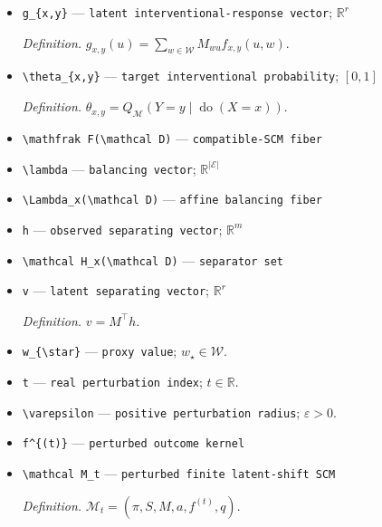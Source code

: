 \documentclass{article}
\begin{document}
\begin{itemize}
  \item \texttt{g\_\allowbreak{}\{x,\allowbreak{}y\}\allowbreak{}} --- \texttt{latent interventional-\allowbreak{}response vector}; \(\mathbb R^r\)
  \par\smallskip\noindent\emph{Definition.} \(g_{x,y}(u)=\sum_{w\in\mathcal W}M_{wu}f_{x,y}(u,w)\).
  \item \texttt{\textbackslash{}\allowbreak{}theta\_\allowbreak{}\{x,\allowbreak{}y\}\allowbreak{}} --- \texttt{target interventional probability}; \([0,1]\)
  \par\smallskip\noindent\emph{Definition.} \(\theta_{x,y}=Q_{\mathcal M}(Y=y\mid\operatorname{do}(X=x))\).
  \item \texttt{\textbackslash{}\allowbreak{}mathfrak F(\textbackslash{}\allowbreak{}mathcal D)} --- \texttt{compatible-\allowbreak{}SCM fiber}
  \item \texttt{\textbackslash{}\allowbreak{}lambda} --- \texttt{balancing vector}; \(\mathbb R^{\lvert\mathcal E\rvert}\)
  \item \texttt{\textbackslash{}\allowbreak{}Lambda\_\allowbreak{}x(\textbackslash{}\allowbreak{}mathcal D)} --- \texttt{affine balancing fiber}
  \item \texttt{h} --- \texttt{observed separating vector}; \(\mathbb R^m\)
  \item \texttt{\textbackslash{}\allowbreak{}mathcal H\_\allowbreak{}x(\textbackslash{}\allowbreak{}mathcal D)} --- \texttt{separator set}
  \item \texttt{v} --- \texttt{latent separating vector}; \(\mathbb R^r\)
  \par\smallskip\noindent\emph{Definition.} \(v=M^{\top}h\).
  \item \texttt{w\_\allowbreak{}\{\textbackslash{}\allowbreak{}star\}\allowbreak{}} --- \texttt{proxy value}; \(w_{\star}\in\mathcal W\).
  \item \texttt{t} --- \texttt{real perturbation index}; \(t\in\mathbb R\).
  \item \texttt{\textbackslash{}\allowbreak{}varepsilon} --- \texttt{positive perturbation radius}; \(\varepsilon>0\).
  \item \texttt{f\textasciicircum{}\{(t)\}\allowbreak{}} --- \texttt{perturbed outcome kernel}
  \item \texttt{\textbackslash{}\allowbreak{}mathcal M\_\allowbreak{}t} --- \texttt{perturbed finite latent-\allowbreak{}shift SCM}
  \par\smallskip\noindent\emph{Definition.} \(\mathcal M_t=(\pi,S,M,a,f^{(t)},q)\).

\end{itemize}
\end{document}
